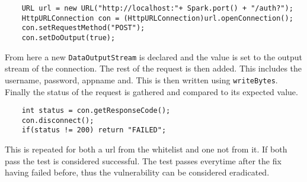 \begin{verbatim}
    URL url = new URL("http://localhost:"+ Spark.port() + "/auth?");
    HttpURLConnection con = (HttpURLConnection)url.openConnection();
    con.setRequestMethod("POST");
    con.setDoOutput(true);
\end{verbatim}
From here a new \verb|DataOutputStream| is declared and the value is set to the output stream of the connection. The rest of the request is then added. This includes the username, password,
appname and. This is then written using \verb|writeBytes|. Finally the status of the request is gathered and compared to its expected value.
\begin{verbatim}
    int status = con.getResponseCode();
    con.disconnect();
    if(status != 200) return "FAILED";
\end{verbatim}
This is repeated for both a url from the whitelist and one not from it. If both pass the test is considered successful. The test passes everytime after the fix having failed before, thus
the vulnerability can be considered eradicated.\\ \\



